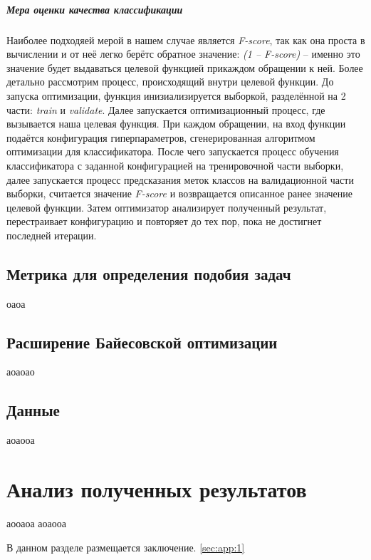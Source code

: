 \documentclass[times,specification,annotation]{itmo-student-thesis}
\begin{document}
		\paragraph{Мера оценки качества классификации} Наиболее подходяей мерой в нашем случае является \textit{F-score}, так как она проста в вычислении и от неё легко берётс обратное значение: \textit{(1 -- F-score)} -- именно это значение будет выдаваться целевой функцией прикаждом обращении к ней.
		Более детально рассмотрим процесс, происходящий внутри целевой функции. До запуска оптимизации, функция инизиализируется выборкой, разделённой на 2 части: \textit{train} и \textit{validate}. Далее запускается оптимизационный процесс, где вызывается наша целевая функция. При каждом обращении, на вход функции подаётся конфигурация гиперпараметров, сгенерированная алгоритмом оптимизации для классификатора. После чего запускается процесс обучения классификатора с заданной конфигурацией на тренировочной части выборки, далее запускается процесс предсказания меток классов на валидационной части выборки, считается значение \textit{F-score} и возвращается описанное ранее значение целевой функции. Затем оптимизатор анализирует полученный результат, перестраивает конфигурацию и повторяет до тех пор, пока не достигнет последней итерации.
	\section{Метрика для определения подобия задач}
	оаоа
	\section{Расширение Байесовской оптимизации}
	аоаоао
	\section{Данные}
	\chapterconclusion
	аоаооа
	
	\chapter{Анализ полученных результатов}
	аооаоа
	\chapterconclusion
	аоаооа
	
	
	\startconclusionpage
	В данном разделе размещается заключение. \ref{sec:app:1}
	
	\printmainbibliography
	
	
	\appendix
\end{document}

